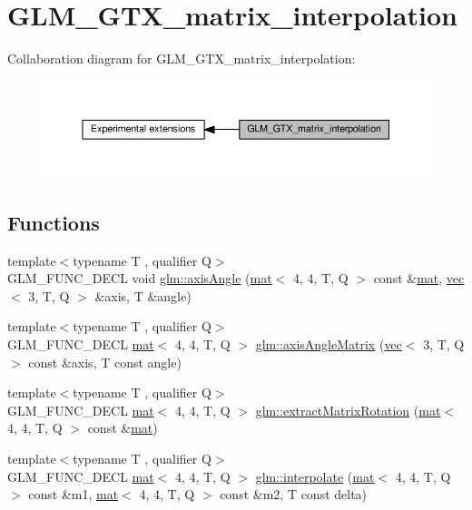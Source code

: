 \hypertarget{group__gtx__matrix__interpolation}{}\section{G\+L\+M\+\_\+\+G\+T\+X\+\_\+matrix\+\_\+interpolation}
\label{group__gtx__matrix__interpolation}
Collaboration diagram for G\+L\+M\+\_\+\+G\+T\+X\+\_\+matrix\+\_\+interpolation\+:
\nopagebreak
\begin{figure}[H]
\begin{center}
\leavevmode
\includegraphics[width=350pt]{da/dc8/group__gtx__matrix__interpolation}
\end{center}
\end{figure}
\subsection*{Functions}
\begin{DoxyCompactItemize}
\item 
{\footnotesize template$<$typename T , qualifier Q$>$ }\\G\+L\+M\+\_\+\+F\+U\+N\+C\+\_\+\+D\+E\+CL void \hyperlink{group__gtx__matrix__interpolation_ga97f160158906ea89676f56cc4697ec98}{glm\+::axis\+Angle} (\hyperlink{structglm_1_1mat}{mat}$<$ 4, 4, T, Q $>$ const \&\hyperlink{structglm_1_1mat}{mat}, \hyperlink{structglm_1_1vec}{vec}$<$ 3, T, Q $>$ \&axis, T \&angle)
\item 
{\footnotesize template$<$typename T , qualifier Q$>$ }\\G\+L\+M\+\_\+\+F\+U\+N\+C\+\_\+\+D\+E\+CL \hyperlink{structglm_1_1mat}{mat}$<$ 4, 4, T, Q $>$ \hyperlink{group__gtx__matrix__interpolation_ga992a5db71893ed1ba6ebac99f0f69831}{glm\+::axis\+Angle\+Matrix} (\hyperlink{structglm_1_1vec}{vec}$<$ 3, T, Q $>$ const \&axis, T const angle)
\item 
{\footnotesize template$<$typename T , qualifier Q$>$ }\\G\+L\+M\+\_\+\+F\+U\+N\+C\+\_\+\+D\+E\+CL \hyperlink{structglm_1_1mat}{mat}$<$ 4, 4, T, Q $>$ \hyperlink{group__gtx__matrix__interpolation_ga8834d4499a1a52fcf531b4506f0b5f67}{glm\+::extract\+Matrix\+Rotation} (\hyperlink{structglm_1_1mat}{mat}$<$ 4, 4, T, Q $>$ const \&\hyperlink{structglm_1_1mat}{mat})
\item 
{\footnotesize template$<$typename T , qualifier Q$>$ }\\G\+L\+M\+\_\+\+F\+U\+N\+C\+\_\+\+D\+E\+CL \hyperlink{structglm_1_1mat}{mat}$<$ 4, 4, T, Q $>$ \hyperlink{group__gtx__matrix__interpolation_gad5fc63a2e084000b39f6508ab07421a5}{glm\+::interpolate} (\hyperlink{structglm_1_1mat}{mat}$<$ 4, 4, T, Q $>$ const \&m1, \hyperlink{structglm_1_1mat}{mat}$<$ 4, 4, T, Q $>$ const \&m2, T const delta)
\end{DoxyCompactItemize}


